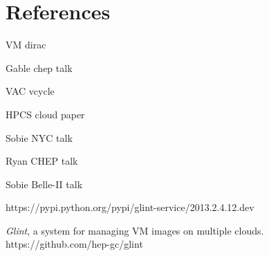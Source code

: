 \documentclass[a4paper]{jpconf}
\begin{document}
\section*{References}
\begin{thebibliography}{9}

VM dirac

Gable chep talk

VAC vcycle

HPCS cloud paper

Sobie NYC talk

Ryan CHEP talk

Sobie Belle-II talk

https://pypi.python.org/pypi/glint-service/2013.2.4.12.dev

{\it Glint}, a system for managing VM images on multiple clouds.
https://github.com/hep-gc/glint

\end{thebibliography}
\end{document}
